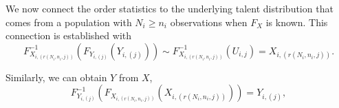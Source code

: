 \documentclass[12pt]{article}
\begin{document}
We now connect the order statistics to the underlying talent distribution that comes from a population with $N_i \geq n_i$ observations when $F_{X}$ is known. This connection is established with 
\begin{equation} \label{eq:trueparX}
F_{X_{i, (r(N_i, n_i, j))}}^{-1}\left(F_{Y_{i,(j)}}\left(Y_{i,(j)} \right)\right) 
  \sim F_{X_{i, (r(N_i, n_i, j))}}^{-1}\left(U_{i,j}\right) 
  = X_{i, (r(N_i, n_i, j))}.
\end{equation}

Similarly, we can obtain $Y$ from $X$,
\begin{equation} \label{eq:trueparY}
 F_{Y_{i, (j)}}^{-1}\left( F_{X_{i, (r(N_i, n_i, j))}}\left(X_{i, (r(N_i, n_i, j))}\right) \right) 
 = Y_{i, (j)},
\end{equation}
\end{document}
